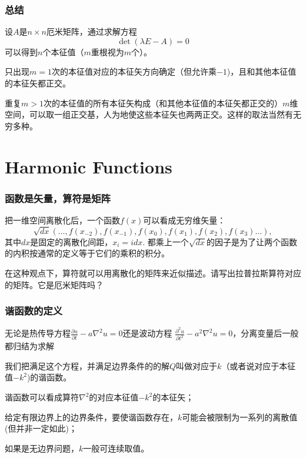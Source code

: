 \documentclass[CJK]{beamer}
\begin{document}
\begin{frame}
  \frametitle{总结}
  \bitem
      \item{设$A$是$n\times n$厄米矩阵，通过求解方程
  $$ \det\left( \lambda E - A\right) = 0 $$
  可以得到$n$个本征值（$m$重根视为$m$个）。}

  \item{只出现$m=1$次的本征值对应的本征矢方向确定（但允许乘$-1$)，且和其他本征值的本征矢都正交。}

  \item{重复$m>1$次的本征值的所有本征矢构成（和其他本征值的本征矢都正交的）$m$维空间，可以取一组正交基，人为地使这些本征矢也两两正交。这样的取法当然有无穷多种。}
    \eitem
    
\end{frame}


\section{Harmonic Functions}


\begin{frame}
  \frametitle{函数是矢量，算符是矩阵}
  把一维空间离散化后，一个函数$f(x)$可以看成无穷维矢量：
  $$\sqrt{dx} \left( \ldots, f(x_{-2}), f(x_{-1}), f(x_0), f(x_1), f(x_2) , f(x_3)\ldots \right), $$
  其中$dx$是固定的离散化间距，$x_i = i dx$. 都乘上一个$\sqrt{dx}$的因子是为了让两个函数的内积按通常的定义等于它们的乘积的积分。

  
  在这种观点下，算符就可以用离散化的矩阵来近似描述。请写出拉普拉斯算符对应的矩阵。它是厄米矩阵吗？
  
\end{frame}

\begin{frame}
\frametitle{谐函数的定义}
无论是热传导方程$\frac{\partial u}{\partial t} -a \nabla^2u = 0$还是波动方程
$\frac{\partial^2u }{\partial t^2} - a^2 \nabla^2 u = 0$，分离变量后一般都归结为求解

我们把{\blue 满足这个方程，并满足边界条件的的解$Q$叫做对应于$k$（或者说对应于本征值$-k^2$)的谐函数。}

\bitem
\item{谐函数可以看成算符$\nabla^2$的对应本征值$-k^2$的本征矢；}
\item{给定有限边界上的边界条件，要使谐函数存在，$k$可能会被限制为一系列的离散值(但并非一定如此)；}
\item{如果是无边界问题，$k$一般可连续取值。}
\eitem


\end{frame}
\end{document}

